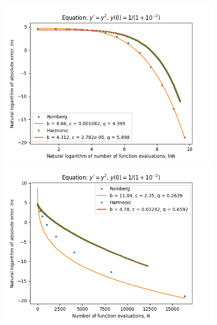 \begin{figure}[H]
\centering
\begin{minipage}{0.45\textwidth}
\centering
\includegraphics[scale=0.45]{emr_plots/singularity_2_hp_log_log_pow_fit_trend.png}
\end{minipage}
\begin{minipage}{0.45\textwidth}
\centering
\includegraphics[scale=0.45]{emr_plots/singularity_2_hp_trend.png}
\end{minipage}
\end{figure}

